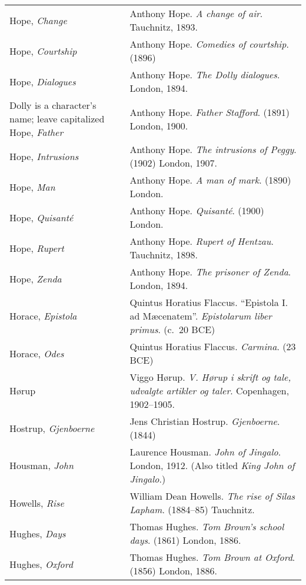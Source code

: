 \begin{longtable}{p{} p{}}
Hope, \textit{Change} & Anthony Hope. \textit{A change of air}. Tauchnitz, 1893. \\
Hope, \textit{Courtship} & Anthony Hope. \textit{Comedies of courtship}. (1896) \\
Hope, \textit{Dialogues} & Anthony Hope. \textit{The Dolly dialogues}. London, 1894. \\ Dolly is a character's name; leave capitalized
Hope, \textit{Father} & Anthony Hope. \textit{Father Stafford}. (1891) London, 1900. \\
Hope, \textit{Intrusions} & Anthony Hope. \textit{The intrusions of Peggy}. (1902) London, 1907. \\
Hope, \textit{Man} & Anthony Hope. \textit{A man of mark}. (1890) London. \\
Hope, \textit{Quisanté} & Anthony Hope. \textit{Quisanté}. (1900) London. \\
Hope, \textit{Rupert} & Anthony Hope. \textit{Rupert of Hentzau}. Tauchnitz, 1898. \\
Hope, \textit{Zenda} & Anthony Hope. \textit{The prisoner of Zenda}. London, 1894. \\

Horace, \textit{Epistola} & Quintus Horatius Flaccus. ``Epistola I. ad Mæcenatem''. \textit{Epistolarum liber primus}. (c.~20 BCE)\\
Horace, \textit{Odes} & Quintus Horatius Flaccus. \textit{Carmina}. (23 BCE)\\

Hørup & Viggo Hørup. \textit{V. Hørup i skrift og tale, udvalgte artikler og taler}. Copenhagen, 1902--1905. \\

Hostrup, \textit{Gjenboerne} & Jens Christian Hostrup. \textit{Gjenboerne}. (1844) \\

Housman, \textit{John} & Laurence Housman. \textit{John of Jingalo}. London, 1912. (Also titled \textit{King John of Jingalo}.) \\

Howells, \textit{Rise} & William Dean Howells. \textit{The rise of Silas Lapham}. (1884--85) Tauchnitz. \\

Hughes, \textit{Days} & Thomas Hughes. \textit{Tom Brown's school days}. (1861) London, 1886. \\ %
Hughes, \textit{Oxford} & Thomas Hughes. \textit{Tom Brown at Oxford}. (1856) London, 1886. \\ %


\end{longtable}
